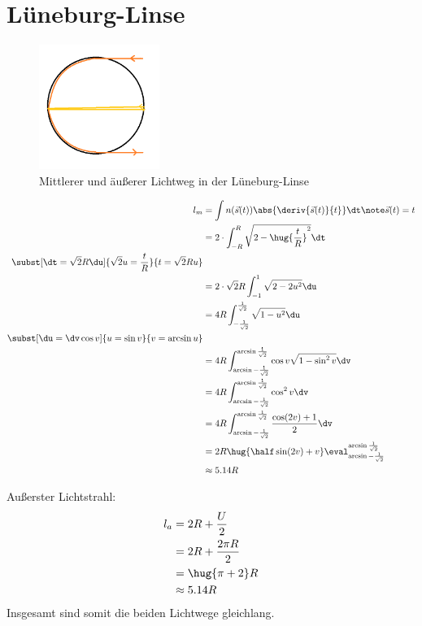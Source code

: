 \documentclass[ex,minted]{exercise}
\begin{document}
\section{Lüneburg-Linse}
\begin{figure}[h]
    \centering
    \includegraphics[width=0.35\textwidth]{4.png}
    \caption{Mittlerer und äußerer Lichtweg in der Lüneburg-Linse}
\end{figure}

\begin{align*}
    l_m &= \int n(\vec s(t)) \abs{\deriv{\vec s(t)}{t}} \dt\note 
    \vec s(t) = t\\
    &= 2\cdot \int_{-R}^{R} \sqrt{2-\hug{\frac tR}^2}\dt\\
    \subst[\dt = \sqrt2 R\du]{\sqrt2 u = \frac t{ R}}{t= \sqrt2 R u}\\
    &= 2\cdot \sqrt2 R \int_{-1}^{1} \sqrt{2-2u^2}\du\\
    &= 4 R \int_{-\frac1{\sqrt{2}}}^{\frac1{\sqrt{2}}} \sqrt{1-u^2}\du\\
    \subst[\du = \dv \cos v]{u = \sin v}{ v = \arcsin u}\\
    &= 4 R \int_{\arcsin-\frac1{\sqrt{2}}}^{\arcsin\frac1{\sqrt{2}}} \cos v \sqrt{1-\sin^2v}\dv\\
    &= 4 R \int_{\arcsin-\frac1{\sqrt{2}}}^{\arcsin\frac1{\sqrt{2}}} \cos^2 v\dv\\
    &= 4 R \int_{\arcsin-\frac1{\sqrt{2}}}^{\arcsin\frac1{\sqrt{2}}} \frac{\cos(2v)+1}{2}\dv\\
    &= 2R \hug{\half\sin(2v)+v}\eval_{\arcsin-\frac1{\sqrt{2}}}^{\arcsin\frac1{\sqrt{2}}}\\
    &\approx 5.14 R
\end{align*}

Außerster Lichtstrahl:
\begin{align*}
    l_a &= 2 R + \frac U2\\
    &= 2 R + \frac {2\pi R}2\\
    &= \hug{\pi + 2} R\\
    &\approx 5.14 R
\end{align*}
Insgesamt sind somit die beiden Lichtwege gleichlang.
\end{document}
